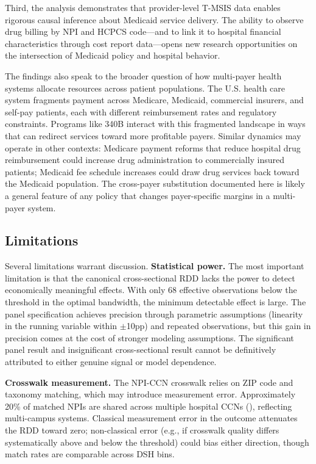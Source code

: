 \documentclass[12pt]{article}
\begin{document}
Third, the analysis demonstrates that provider-level T-MSIS data enables rigorous causal inference about Medicaid service delivery. The ability to observe drug billing by NPI and HCPCS code---and to link it to hospital financial characteristics through cost report data---opens new research opportunities on the intersection of Medicaid policy and hospital behavior.

The findings also speak to the broader question of how multi-payer health systems allocate resources across patient populations. The U.S. health care system fragments payment across Medicare, Medicaid, commercial insurers, and self-pay patients, each with different reimbursement rates and regulatory constraints. Programs like 340B interact with this fragmented landscape in ways that can redirect services toward more profitable payers. Similar dynamics may operate in other contexts: Medicare payment reforms that reduce hospital drug reimbursement could increase drug administration to commercially insured patients; Medicaid fee schedule increases could draw drug services back toward the Medicaid population. The cross-payer substitution documented here is likely a general feature of any policy that changes payer-specific margins in a multi-payer system.

\subsection{Limitations}

Several limitations warrant discussion. \textbf{Statistical power.} The most important limitation is that the canonical cross-sectional RDD lacks the power to detect economically meaningful effects. With only 68 effective observations below the threshold in the optimal bandwidth, the minimum detectable effect is large. The panel specification achieves precision through parametric assumptions (linearity in the running variable within $\pm$10pp) and repeated observations, but this gain in precision comes at the cost of stronger modeling assumptions. The significant panel result and insignificant cross-sectional result cannot be definitively attributed to either genuine signal or model dependence.

\textbf{Crosswalk measurement.} The NPI-CCN crosswalk relies on ZIP code and taxonomy matching, which may introduce measurement error. Approximately 20\% of matched NPIs are shared across multiple hospital CCNs (), reflecting multi-campus systems. Classical measurement error in the outcome attenuates the RDD toward zero; non-classical error (e.g., if crosswalk quality differs systematically above and below the threshold) could bias either direction, though match rates are comparable across DSH bins.
\end{document}
